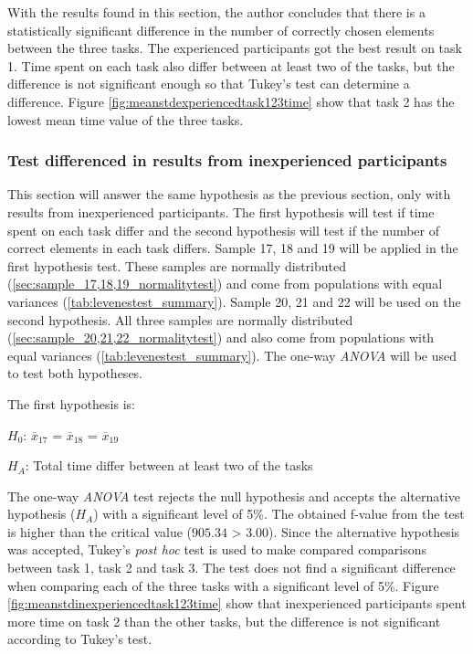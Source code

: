 \vspace{0.3cm}

With the results found in this section, the author concludes that there is a statistically significant difference in the number of correctly chosen elements between the three tasks. The experienced participants got the best result on task 1. Time spent on each task also differ between at least two of the tasks, but the difference is not significant enough so that Tukey's test can determine a difference. Figure \ref{fig:meanstdexperiencedtask123time} show that task 2 has the lowest mean time value of the three tasks.  


\subsubsection[Sample 17 -  22]{Test differenced in results from inexperienced participants}\label{sec:sample_17_18_19_anova}

This section will answer the same hypothesis as the previous section, only with results from inexperienced participants. The first hypothesis will test if time spent on each task differ and the second hypothesis will test if the number of correct elements in each task differs. Sample 17, 18 and 19 will be applied in the first hypothesis test. These samples are normally distributed (\ref{sec:sample_17,18,19_normalitytest}) and come from populations with equal variances (\ref{tab:levenestest_summary}). Sample 20, 21 and 22 will be used on the second hypothesis. All three samples are normally distributed (\ref{sec:sample_20,21,22_normalitytest}) and also come from populations with equal variances (\ref{tab:levenestest_summary}). The one-way \textit{ANOVA} will be used to test both hypotheses. 

The first hypothesis is:\\
\centerline{$H_{0}$: $\overline{x}_{17}$ = $\overline{x}_{18}$ = $\overline{x}_{19}$}
\centerline{$H_{A}$: Total time differ between at least two of the tasks}
\vspace{0.2cm}

The one-way \textit{ANOVA} test rejects the null hypothesis and accepts the alternative hypothesis ($H_{A}$) with a significant level of 5\%. The obtained f-value from the test is higher than the critical value ($905.34$ > $3.00$). Since the alternative hypothesis was accepted, Tukey's \textit{post hoc} test is used to make compared comparisons between task 1, task 2 and task 3. The test does not find a significant difference when comparing each of the three tasks with a significant level of 5\%. Figure \ref{fig:meanstdinexperiencedtask123time} show that inexperienced participants spent more time on task 2 than the other tasks, but the difference is not significant according to Tukey's test.

